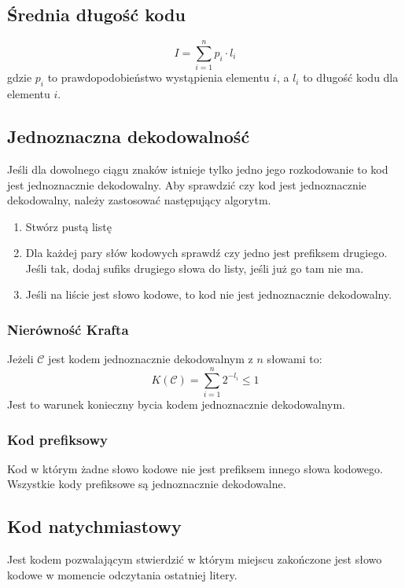 \documentclass{../notatki}
\begin{document}
\subsection{Średnia długość kodu}

$$
I = \sum_{i=1}^{n}p_i \cdot l_i
$$
gdzie $p_i$ to prawdopodobieństwo wystąpienia elementu $i$, a $l_i$ to długość
kodu dla elementu $i$.

\subsection{Jednoznaczna dekodowalność}

Jeśli dla dowolnego ciągu znaków istnieje tylko jedno jego rozkodowanie to
kod jest jednoznacznie dekodowalny. Aby sprawdzić czy kod jest jednoznacznie
dekodowalny, należy zastosować następujący algorytm.

\begin{enumerate}
  \item Stwórz pustą listę
  \item Dla każdej pary słów kodowych sprawdź czy jedno jest prefiksem
    drugiego. Jeśli tak, dodaj sufiks drugiego słowa do listy, jeśli
    już go tam nie ma.
  \item Jeśli na liście jest słowo kodowe, to kod nie jest jednoznacznie
    dekodowalny.
\end{enumerate}

\subsubsection{Nierówność Krafta}

Jeżeli $\mathcal{C}$ jest kodem jednoznacznie dekodowalnym z $n$ słowami to:
$$
K(\mathcal{C}) = \sum_{i=1}^{n}2^{-l_i} \leq 1
$$
Jest to warunek konieczny bycia kodem jednoznacznie dekodowalnym.

\subsubsection{Kod prefiksowy}

Kod w którym żadne słowo kodowe nie jest prefiksem innego słowa
kodowego. Wszystkie kody prefiksowe są jednoznacznie dekodowalne.

\subsection{Kod natychmiastowy}

Jest kodem pozwalającym stwierdzić w którym miejscu zakończone jest
słowo kodowe w momencie odczytania ostatniej litery.
\end{document}
